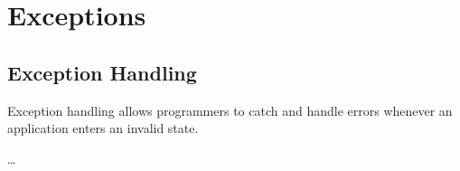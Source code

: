 \chapter{Exceptions}
\label{chap:exceptions}
\section{Exception Handling}
Exception handling allows programmers to catch and handle errors whenever an application enters an invalid state.

\dots 

